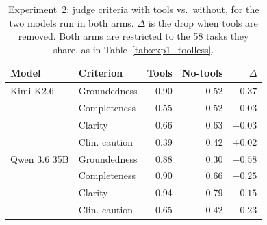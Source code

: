 \begin{table}[H]
\centering
\caption{Experiment~2: judge criteria with tools vs.\ without, for the two models run in both arms. $\Delta$ is the drop when tools are removed. Both arms are restricted to the 58 tasks they share, as in Table~\ref{tab:exp1_toolless}.}
\label{tab:exp1_judge_toolless}
\small
\setlength{\tabcolsep}{5pt}
\begin{tabular}{@{}llrrr@{}}
\toprule
Model & Criterion & Tools & No-tools & $\Delta$ \\
\midrule
Kimi K2.6 & Groundedness & 0.90 & 0.52 & $-0.37$ \\
 & Completeness & 0.55 & 0.52 & $-0.03$ \\
 & Clarity & 0.66 & 0.63 & $-0.03$ \\
 & Clin. caution & 0.39 & 0.42 & $+0.02$ \\
\addlinespace
Qwen 3.6 35B & Groundedness & 0.88 & 0.30 & $-0.58$ \\
 & Completeness & 0.90 & 0.66 & $-0.25$ \\
 & Clarity & 0.94 & 0.79 & $-0.15$ \\
 & Clin. caution & 0.65 & 0.42 & $-0.23$ \\
\bottomrule
\end{tabular}
\end{table}
